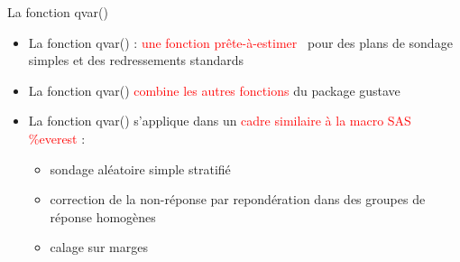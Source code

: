 \documentclass[xcolor=dvipsnames]{beamer}
\begin{document}
\begin{frame}{La fonction qvar()}

\begin{itemize}
    \item La fonction qvar() : \og \textcolor{red}{une fonction prête-à-estimer} \fg \ pour des plans de sondage simples et des redressements standards
    
    \vspace{0.5 cm}
    
    \item La fonction qvar() \textcolor{red}{combine les autres fonctions} du package gustave
    
    \vspace{0.5 cm}
    
    \item La fonction qvar() s'applique dans un \textcolor{red}{cadre similaire à la macro SAS \%everest} :
    \vspace{0.1 cm}
    \begin{itemize}
        \item sondage aléatoire simple stratifié
        \vspace{0.1 cm}
        \item correction de la non-réponse par repondération dans des groupes de réponse homogènes
        \vspace{0.1 cm}
        \item calage sur marges
    \end{itemize}
\end{itemize}
    
\end{frame}
\end{document}

